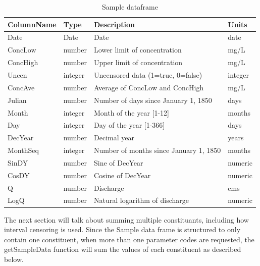 \documentclass[a4paper,11pt]{article}\usepackage[]{graphicx}\usepackage[]{color}
\begin{document}
\begin{table}[!ht]
\begin{minipage}{\linewidth}
\begin{center}
\caption{Sample dataframe} 
\begin{tabular}{llll}
  \hline
ColumnName & Type & Description & Units \\ 
  \hline
Date & Date & Date & date \\ 
  ConcLow & number & Lower limit of concentration & mg/L \\ 
  ConcHigh & number & Upper limit of concentration & mg/L \\ 
  Uncen & integer & Uncensored data (1=true, 0=false) & integer \\ 
  ConcAve & number & Average of ConcLow and ConcHigh & mg/L \\ 
  Julian & number & Number of days since January 1, 1850 & days \\ 
  Month & integer & Month of the year [1-12] & months \\ 
  Day & integer & Day of the year [1-366] & days \\ 
  DecYear & number & Decimal year & years \\ 
  MonthSeq & integer & Number of months since January 1, 1850 & months \\ 
  SinDY & number & Sine of DecYear & numeric \\ 
  CosDY & number & Cosine of DecYear & numeric \\ 
  Q \footnotemark[1] & number & Discharge & cms \\ 
  LogQ \footnotemark[1] & number & Natural logarithm of discharge & numeric \\ 
   \hline
\end{tabular}
\end{center}
\end{minipage}
\end{table}


The next section will talk about summing multiple constituants, including how interval censoring is used. Since the Sample data frame is structured to only contain one constituent, when more than one parameter codes are requested, the getSampleData function will sum the values of each constituent as described below.

\FloatBarrier


\end{document}

